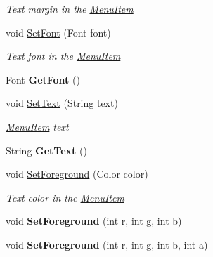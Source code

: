 \begin{DoxyCompactItemize}
\begin{DoxyCompactList}\small\item\em Text margin in the \mbox{\hyperlink{class_space_v_i_l_1_1_menu_item}{Menu\+Item}} \end{DoxyCompactList}\item 
void \mbox{\hyperlink{class_space_v_i_l_1_1_menu_item_a8f81cd6c91a758c5040c0fff74d803eb}{Set\+Font}} (Font font)
\begin{DoxyCompactList}\small\item\em Text font in the \mbox{\hyperlink{class_space_v_i_l_1_1_menu_item}{Menu\+Item}} \end{DoxyCompactList}\item 
\mbox{\label{class_space_v_i_l_1_1_menu_item_a6d6f463d4323233c57692136bd37fc21}} 
Font {\bfseries Get\+Font} ()
\item 
void \mbox{\hyperlink{class_space_v_i_l_1_1_menu_item_aaf17e0e26cc6532de675cc6d2fdafc1e}{Set\+Text}} (String text)
\begin{DoxyCompactList}\small\item\em \mbox{\hyperlink{class_space_v_i_l_1_1_menu_item}{Menu\+Item}} text \end{DoxyCompactList}\item 
\mbox{\label{class_space_v_i_l_1_1_menu_item_a2c1e69141686df11fa69942e9fafcbc0}} 
String {\bfseries Get\+Text} ()
\item 
void \mbox{\hyperlink{class_space_v_i_l_1_1_menu_item_ab66887ca29fcd817a4b4505e92e01919}{Set\+Foreground}} (Color color)
\begin{DoxyCompactList}\small\item\em Text color in the \mbox{\hyperlink{class_space_v_i_l_1_1_menu_item}{Menu\+Item}} \end{DoxyCompactList}\item 
\mbox{\label{class_space_v_i_l_1_1_menu_item_a5aceeddbc86e063accdd29f91a3ba42a}} 
void {\bfseries Set\+Foreground} (int r, int g, int b)
\item 
\mbox{\label{class_space_v_i_l_1_1_menu_item_a85652f31f3ab6192ffbca22841b44ea2}} 
void {\bfseries Set\+Foreground} (int r, int g, int b, int a)
\item 
\mbox{\label{class_space_v_i_l_1_1_menu_item_ad84473f572fdb8a0ce39ec1aeeb678a9}} 

\end{DoxyCompactItemize}
